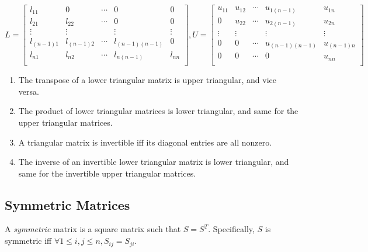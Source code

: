 \documentclass{report}
\begin{document}
		\begin{displaymath}
		L=
			\begin{bmatrix}
				l_{11}     & 0          & \cdots & 0              & 0      \\
				l_{21}     & l_{22}     & \cdots & 0              & 0      \\
				\vdots     & \vdots     &        & \vdots         & \vdots \\
				l_{(n-1)1} & l_{(n-1)2} & \cdots & l_{(n-1)(n-1)} & 0      \\
				l_{n1}     & l_{n2}     & \cdots & l_{n(n-1)}     & l_{nn} \\
			\end{bmatrix}
		, U=
			\begin{bmatrix}
				u_{11} & u_{12} & \cdots & u_{1(n-1)}     & u_{1n}     \\
				0      & u_{22} & \cdots & u_{2(n-1)}     & u_{2n}     \\
				\vdots & \vdots &        & \vdots         & \vdots     \\
				0      & 0      & \cdots & u_{(n-1)(n-1)} & u_{(n-1)n} \\
				0      & 0      & \cdots & 0              & u_{nn}     \\
			\end{bmatrix}
		\end{displaymath}
		
		\begin{thm}
			\begin{enumerate}
				\item The transpose of a lower triangular matrix is upper triangular, and vice versa.
				\item The product of lower triangular matrices is lower triangular, and same for the upper triangular matrices.
				\item A triangular matrix is invertible iff its diagonal entries are all nonzero.
				\item The inverse of an invertible lower triangular matrix is lower triangular, and same for the invertible upper triangular matrices.
			\end{enumerate}
		\end{thm}
		
		\subsection{Symmetric Matrices}
		A \emph{symmetric} matrix is a square matrix such that $S=S^T$. Specifically, $S$ is symmetric iff $\forall 1 \le i,j \le n, S_{ij}=S_{ji}$.
		
\end{document}
